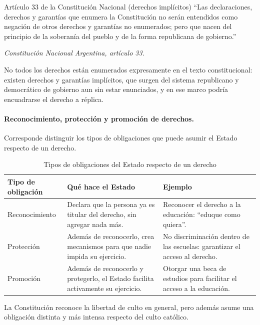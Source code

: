 \documentclass[12pt,oneside]{book}
\begin{document}
\begin{definition}{Artículo 33 de la Constitución Nacional (derechos implícitos)}
``Las declaraciones, derechos y garantías que enumera la Constitución no serán entendidos como negación de otros derechos y garantías no enumerados; pero que nacen del principio de la soberanía del pueblo y de la forma republicana de gobierno.''

\textit{Constitución Nacional Argentina, artículo 33.}
\end{definition}

No todos los derechos están enumerados expresamente en el texto constitucional: existen derechos y garantías implícitos, que surgen del sistema republicano y democrático de gobierno aun sin estar enunciados, y en ese marco podría encuadrarse el derecho a réplica.

\paragraph{Reconocimiento, protección y promoción de derechos.}
Corresponde distinguir los tipos de obligaciones que puede asumir el Estado respecto de un derecho.

\begin{table}[H]
\centering
\caption{Tipos de obligaciones del Estado respecto de un derecho}
\begin{tabularx}{\textwidth}{@{}>{\raggedright\arraybackslash}p{}>{\raggedright\arraybackslash}p{}X@{}}
\toprule
\textbf{Tipo de obligación} & \textbf{Qué hace el Estado} & \textbf{Ejemplo} \\
\midrule
Reconocimiento & Declara que la persona ya es titular del derecho, sin agregar nada más. & Reconocer el derecho a la educación: ``eduque como quiera''. \\
\addlinespace
Protección & Además de reconocerlo, crea mecanismos para que nadie impida su ejercicio. & No discriminación dentro de las escuelas: garantizar el acceso al derecho. \\
\addlinespace
Promoción & Además de reconocerlo y protegerlo, el Estado facilita activamente su ejercicio. & Otorgar una beca de estudios para facilitar el acceso a la educación. \\
\bottomrule
\end{tabularx}
\end{table}

La Constitución reconoce la libertad de culto en general, pero además asume una obligación distinta y más intensa respecto del culto católico.
\end{document}
